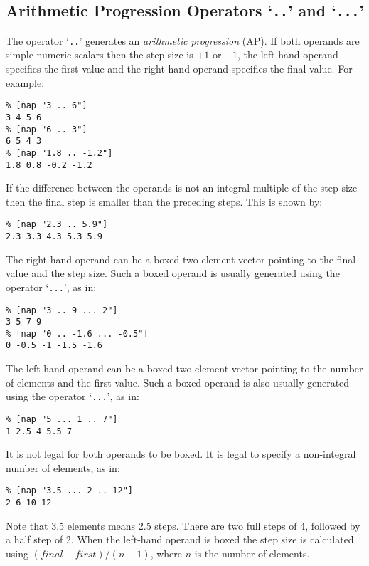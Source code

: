 \subsection{Arithmetic Progression Operators `\texttt{..}' and `\texttt{...}'}
    \label{op-AP}
  
The operator `\texttt{..}' generates an \emph{arithmetic progression}
(AP).
If both
  operands are simple numeric scalars then the step size is $+1$ or
  $-1$, the left-hand operand specifies the first value and the
  right-hand operand specifies the final value. For example:
  \begin{verbatim}
% [nap "3 .. 6"]
3 4 5 6
% [nap "6 .. 3"]
6 5 4 3
% [nap "1.8 .. -1.2"]
1.8 0.8 -0.2 -1.2
\end{verbatim}

If the difference between the operands is not an integral
multiple of the step size then the final step is smaller than the
preceding steps. This is shown by:
  \begin{verbatim}
% [nap "2.3 .. 5.9"]
2.3 3.3 4.3 5.3 5.9
\end{verbatim}

  
 The right-hand operand can be a boxed two-element vector pointing
  to the final value and the step size. Such a boxed operand is usually
  generated using the operator `\texttt{...}', as in:
  \begin{verbatim}
% [nap "3 .. 9 ... 2"]
3 5 7 9
% [nap "0 .. -1.6 ... -0.5"]
0 -0.5 -1 -1.5 -1.6
\end{verbatim}

  
 The left-hand operand can be a boxed two-element vector pointing
  to the number of elements and the first value. Such a boxed operand
  is also usually generated using the operator `\texttt{...}', as in:
  \begin{verbatim}
% [nap "5 ... 1 .. 7"]
1 2.5 4 5.5 7
\end{verbatim}

It is not legal for both operands to be boxed. It is legal to
specify a non-integral number of elements, as in:
  \begin{verbatim}
% [nap "3.5 ... 2 .. 12"]
2 6 10 12
\end{verbatim}

Note that 3.5 elements means 2.5 steps. There are two full steps
of 4, followed by a half step of 2. When the left-hand operand is boxed
the step size is calculated using
  $(\mathit{final}-\mathit{first})/(n-1)$,
where $n$ is the number of elements.
  
